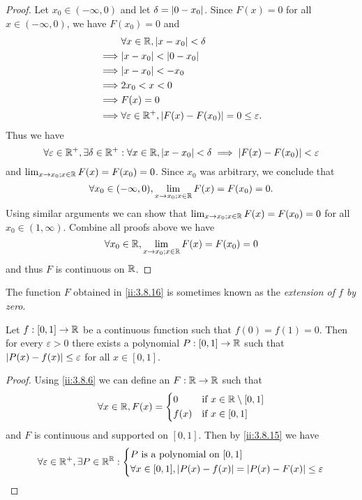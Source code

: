 \begin{proof}
  Let \(x_0 \in (-\infty, 0)\) and let \(\delta = \left\lvert0 - x_0\right\rvert\).
  Since \(F(x) = 0\) for all \(x \in (-\infty, 0)\), we have \(F(x_0) = 0\) and
  \begin{align*}
             & \forall x \in \R, \abs{x - x_0} < \delta                                \\
    \implies & \abs{x - x_0} < \abs{0 - x_0}                                           \\
    \implies & \abs{x - x_0} < -x_0                                                    \\
    \implies & 2x_0 < x < 0                                                            \\
    \implies & F(x) = 0                                                                \\
    \implies & \forall \varepsilon \in \R^+, \abs{F(x) - F(x_0)} = 0 \leq \varepsilon.
  \end{align*}
  Thus we have
  \[
    \forall \varepsilon \in \mathbb{R}^+, \exists \delta \in \mathbb{R}^+ : \forall x \in \mathbb{R}, \left\lvert x - x_0\right\rvert < \delta \implies \left\lvert F(x) - F(x_0)\right\rvert < \varepsilon
  \]
  and \(\lim_{x \to x_0 ; x \in \mathbb{R}} F(x) = F(x_0) = 0\).
  Since \(x_0\) was arbitrary, we conclude that
  \[
    \forall x_0 \in (-\infty, 0), \lim_{x \to x_0 ; x \in \mathbb{R}} F(x) = F(x_0) = 0.
  \]
  Using similar arguments we can show that \(\lim_{x \to x_0 ; x \in \mathbb{R}} F(x) = F(x_0) = 0\) for all \(x_0 \in (1, \infty)\).
  Combine all proofs above we have
  \[
    \forall x_0 \in \mathbb{R}, \lim_{x \to x_0 ; x \in \mathbb{R}} F(x) = F(x_0) = 0
  \]
  and thus \(F\) is continuous on \(\mathbb{R}\).
\end{proof}

\begin{rmk}\label{ii:3.8.17}
  The function \(F\) obtained in \cref{ii:3.8.16} is sometimes known as the \emph{extension of \(f\) by zero}.
\end{rmk}

\begin{cor}\label{ii:3.8.18}
  Let \(f : [0, 1] \to \mathbb{R}\) be a continuous function such that \(f(0) = f(1) = 0\).
  Then for every \(\varepsilon > 0\) there exists a polynomial \(P : [0, 1] \to \mathbb{R}\) such that \(\left\lvert P(x) - f(x)\right\rvert \leq \varepsilon\) for all \(x \in [0, 1]\).
\end{cor}

\begin{proof}
  Using \cref{ii:3.8.6} we can define an \(F : \mathbb{R} \to \mathbb{R}\) such that
  \[
    \forall x \in \mathbb{R}, F(x) = \begin{dcases}
      0    & \text{if } x \in \mathbb{R} \setminus [0, 1] \\
      f(x) & \text{if } x \in [0, 1]
    \end{dcases}
  \]
  and \(F\) is continuous and supported on \([0, 1]\).
  Then by \cref{ii:3.8.15} we have
  \[
    \forall \varepsilon \in \mathbb{R}^+, \exists P \in \mathbb{R}^{\mathbb{R}} : \begin{dcases}
      P \text{ is a polynomial on } [0, 1] \\
      \forall x \in [0, 1], \left\lvert P(x) - f(x)\right\rvert = \left\lvert P(x) - F(x)\right\rvert \leq \varepsilon
    \end{dcases}
  \]
\end{proof}

